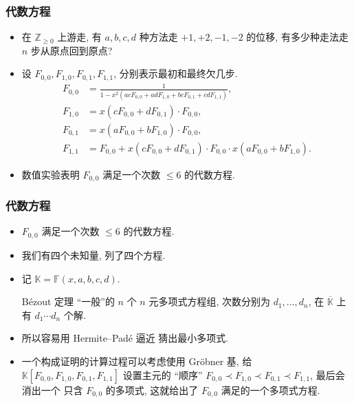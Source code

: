 \documentclass{ctexbeamer}
\newcommand{\bbF}{\mathbb F}
\begin{document}
\begin{frame}
  \frametitle{代数方程}

  \begin{itemize}
    \item 在 $\mathbb Z_{\geq 0}$ 上游走, 有 $a,b,c,d$ 种方法走 $+1, +2, -1, -2$ 的位移, 有多少种走法走 $n$
    步从原点回到原点?
    \pause
    \item 设 $F_{0,0}, F_{1,0}, F_{0, 1}, F_{1,1}$, 分别表示最初和最终欠几步.
    \begin{align}
      F_{0,0} &= \frac 1{1- x^2 (ac F_{0,0} + adF_{1,0} + bcF_{0,1} + cdF_{1,1})},\\
      F_{1,0} &= x(cF_{0,0}+dF_{0,1}) \cdot F_{0,0},\\
      F_{0,1} &= x(aF_{0,0}+bF_{1,0}) \cdot F_{0,0},\\
      F_{1,1} &= F_{0,0} + x(cF_{0,0}+dF_{0,1}) \cdot F_{0,0} \cdot x(aF_{0,0}+bF_{1,0}).
    \end{align}
    \pause
    \item 数值实验表明 $F_{0,0}$ 满足一个次数 $\leq 6$ 的代数方程.
  \end{itemize}

\end{frame}

\begin{frame}
  \frametitle{代数方程}

  \begin{itemize}
    \item $F_{0,0}$ 满足一个次数 $\leq 6$ 的代数方程.
    \item 我们有四个未知量, 列了四个方程.
    \item 记 $\mathbb K = \bbF(x, a, b, c, d)$.
    \pause
    \begin{alertblock}{B\'ezout 定理}
      ``一般''的 $n$ 个 $n$ 元多项式方程组, 次数分别为 $d_1,\dots,d_n$, 在
      $\overline{\mathbb K}$ 上有 $d_1\cdots d_n$ 个解.
    \end{alertblock}
    \pause
    \item 所以容易用 Hermite--Pad\'e 逼近 猜出最小多项式.
    \pause
    \item 一个构成证明的计算过程可以考虑使用 Gr\"obner 基, 给 $\mathbb K[F_{0,0}, F_{1,0}, F_{0,1}, F_{1,1}]$
    设置主元的 ``顺序'' $F_{0,0} \prec F_{1,0} \prec F_{0,1} \prec F_{1,1}$, 最后会消出一个
    只含 $F_{0,0}$ 的多项式, 这就给出了 $F_{0,0}$ 满足的一个多项式方程.
  \end{itemize}

\end{frame}
\end{document}
